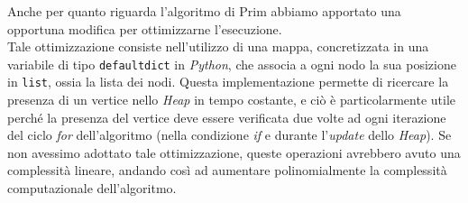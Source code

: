 Anche per quanto riguarda l'algoritmo di Prim abbiamo apportato una opportuna modifica per ottimizzarne l'esecuzione. \\
Tale ottimizzazione consiste nell'utilizzo di una mappa, concretizzata in una variabile di tipo
\texttt{defaultdict} in \textit{Python}, che associa a ogni nodo la sua posizione in \texttt{list}, ossia
la lista dei nodi. Questa implementazione permette di ricercare la presenza di un vertice nello \textit{Heap} in tempo costante,
e ciò è particolarmente utile perché la presenza del vertice deve essere verificata due volte ad ogni iterazione del ciclo \textit{for}
dell'algoritmo (nella condizione \textit{if} e durante l'\textit{update} dello \textit{Heap}).
Se non avessimo adottato tale ottimizzazione, queste operazioni avrebbero avuto una complessità lineare, andando così ad aumentare
polinomialmente la complessità computazionale dell'algoritmo.